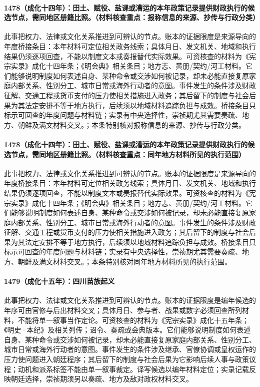 \paragraph{1478（成化十四年）：田土、赋役、盐课或漕运的本年政策记录提供财政执行的候选节点，需同地区册籍比照。（材料核查重点：报称信息的来源、抄传与行政分类）} 此事把权力、法律或文化关系推进到可辨认的节点。账本的证据限度是来源导向的年度桥接条目：本年材料可定位相关政务线索；具体月日、发文机关、地域和执行结果仍须逐项回查，不能以制度文本或奏报替代实际效果。可资核查的材料为《宪宗实录》成化十四年条；《明会典》相关条目；地方志、黄册/契约/河工材料。它们能够说明制度如何表述自身、某种命令或交涉如何被记录，却未必能直接复原家庭内部关系、性别分工、城市日常或海外行动者的意图。事件发生的条件涉及财政征解、交通工程或货币支付的压力使相关措施进入政务；其后留下的制度与社会后果为其法定安排不等于地方执行，后续须以地域材料追踪负担与成效。桥接条目只标示可回查的年度问题与材料链；实录有中央选择性，崇祯期尤其需要奏疏、地方、朝鲜及满文材料交叉。；本条特别核对报称信息的来源、抄传与行政分类。

\paragraph{1478（成化十四年）：田土、赋役、盐课或漕运的本年政策记录提供财政执行的候选节点，需同地区册籍比照。（材料核查重点：同年地方材料所见的执行范围）} 此事把权力、法律或文化关系推进到可辨认的节点。账本的证据限度是来源导向的年度桥接条目：本年材料可定位相关政务线索；具体月日、发文机关、地域和执行结果仍须逐项回查，不能以制度文本或奏报替代实际效果。可资核查的材料为《宪宗实录》成化十四年条；《明会典》相关条目；地方志、黄册/契约/河工材料。它们能够说明制度如何表述自身、某种命令或交涉如何被记录，却未必能直接复原家庭内部关系、性别分工、城市日常或海外行动者的意图。事件发生的条件涉及财政征解、交通工程或货币支付的压力使相关措施进入政务；其后留下的制度与社会后果为其法定安排不等于地方执行，后续须以地域材料追踪负担与成效。桥接条目只标示可回查的年度问题与材料链；实录有中央选择性，崇祯期尤其需要奏疏、地方、朝鲜及满文材料交叉。；本条特别核对同年地方材料所见的执行范围。

\paragraph{1479（成化十五年）：四川苗族起义} 此事把权力、法律或文化关系推进到可辨认的节点。账本的证据限度是编年候选的年序可由官修与后出材料交叉；具体月日、参与者、战果或数字必须回查所列材料，不能将单一叙事当作定论。可资核查的材料为《宪宗实录》成化十五年条；《明史·本纪》及相关列传；诏令、奏疏或会典版本。它们能够说明制度如何表述自身、某种命令或交涉如何被记录，却未必能直接复原家庭内部关系、性别分工、城市日常或海外行动者的意图。事件发生的条件涉及继承、官僚协调或皇权运作的压力使问题进入朝廷程序；其后留下的制度与社会后果为它影响后续人事与政策议程；动机和派系标签不能由单一叙事裁定。译写候选以编年材料定位；实录记载反映朝廷选择，崇祯期须另以奏疏、地方及敌对政权材料交叉。

